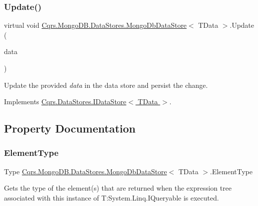 \subsubsection{\texorpdfstring{Update()}{Update()}}
{\footnotesize\ttfamily virtual void \hyperlink{classCqrs_1_1MongoDB_1_1DataStores_1_1MongoDbDataStore}{Cqrs.\+Mongo\+D\+B.\+Data\+Stores.\+Mongo\+Db\+Data\+Store}$<$ T\+Data $>$.Update (\begin{DoxyParamCaption}\item[{T\+Data}]{data }\end{DoxyParamCaption})\hspace{0.3cm}{\ttfamily [virtual]}}



Update the provided {\itshape data}  in the data store and persist the change. 



Implements \hyperlink{interfaceCqrs_1_1DataStores_1_1IDataStore_a6d5d4dd572de8db01ff0c48d37faefa7_a6d5d4dd572de8db01ff0c48d37faefa7}{Cqrs.\+Data\+Stores.\+I\+Data\+Store$<$ T\+Data $>$}.



\subsection{Property Documentation}
\mbox{\label{classCqrs_1_1MongoDB_1_1DataStores_1_1MongoDbDataStore_a54f5798a67d64a47e6acb15f378fb246_a54f5798a67d64a47e6acb15f378fb246}} 
\subsubsection{\texorpdfstring{Element\+Type}{ElementType}}
{\footnotesize\ttfamily Type \hyperlink{classCqrs_1_1MongoDB_1_1DataStores_1_1MongoDbDataStore}{Cqrs.\+Mongo\+D\+B.\+Data\+Stores.\+Mongo\+Db\+Data\+Store}$<$ T\+Data $>$.Element\+Type\hspace{0.3cm}{\ttfamily [get]}}



Gets the type of the element(s) that are returned when the expression tree associated with this instance of T\+:\+System.\+Linq.\+I\+Queryable is executed. 

